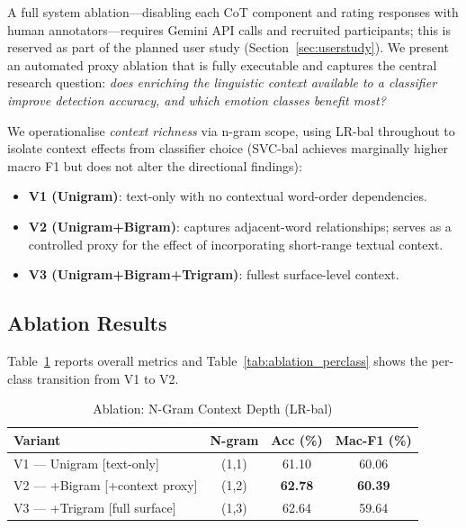 \documentclass[conference]{IEEEtran}
\begin{document}
A full system ablation---disabling each CoT component and
rating responses with human annotators---requires Gemini API
calls and recruited participants; this is reserved as part of
the planned user study (Section~\ref{sec:userstudy}).
We present an automated proxy ablation that is fully executable
and captures the central research question: \emph{does
enriching the linguistic context available to a classifier
improve detection accuracy, and which emotion classes benefit
most?}

We operationalise \emph{context richness} via n-gram scope,
using LR-bal throughout to isolate context effects from
classifier choice (SVC-bal achieves marginally higher macro F1
but does not alter the directional findings):
\begin{itemize}
    \item \textbf{V1 (Unigram)}: text-only with no contextual
          word-order dependencies.
    \item \textbf{V2 (Unigram+Bigram)}: captures adjacent-word
          relationships; serves as a controlled proxy for the
          effect of incorporating short-range textual context.
    \item \textbf{V3 (Unigram+Bigram+Trigram)}: fullest
          surface-level context.
\end{itemize}

\subsection{Ablation Results}

Table~\ref{tab:ablation} reports overall metrics and
Table~\ref{tab:ablation_perclass} shows the per-class
transition from V1 to V2.

\begin{table}[htbp]
\centering
\caption{Ablation: N-Gram Context Depth (LR-bal)}
\label{tab:ablation}
\begin{tabular}{lccc}
\toprule
\textbf{Variant} & \textbf{N-gram} & \textbf{Acc (\%)} &
\textbf{Mac-F1 (\%)} \\
\midrule
V1 --- Unigram [text-only]          & (1,1) & 61.10 & 60.06 \\
V2 --- +Bigram [+context proxy]     & (1,2) & \textbf{62.78} &
\textbf{60.39} \\
V3 --- +Trigram [full surface]      & (1,3) & 62.64 & 59.64 \\
\bottomrule
\end{tabular}
\end{table}
\end{document}
